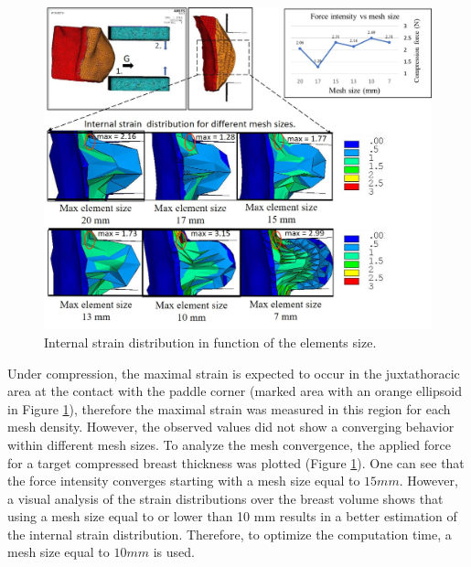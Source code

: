 \begin{figure}[!h]
\centering
\includegraphics[width=\textwidth,keepaspectratio]{figures/meshConvergence.jpg} 
\caption{Internal strain distribution in function of the elements size. }\label{fig:meshconvergence}
\end{figure}

Under compression, the maximal strain is expected to occur in the juxtathoracic area at the contact with the paddle corner (marked area with an orange ellipsoid in Figure \ref{fig:meshconvergence}), therefore the maximal strain was measured in this region for each mesh density. However, the observed values did not show a converging behavior within different mesh sizes. To analyze the mesh convergence, the applied force for a target compressed breast thickness was plotted (Figure \ref{fig:meshconvergence}). One can see that the force intensity converges starting with a mesh size equal to $15mm$. However, a visual analysis of the strain distributions over the breast volume shows that using a mesh size equal to or lower than 10 mm results in a better estimation of the internal strain distribution. Therefore, to optimize the computation time, a mesh size equal to $10mm$ is used.
